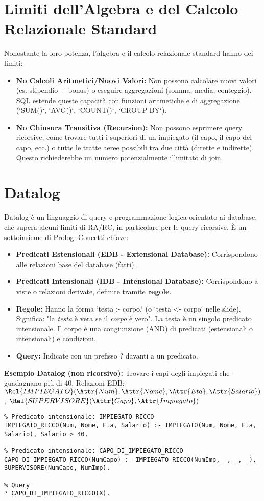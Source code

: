 \section{Limiti dell'Algebra e del Calcolo Relazionale Standard}
Nonostante la loro potenza, l'algebra e il calcolo relazionale standard hanno dei limiti:
\begin{itemize}
	\item \textbf{No Calcoli Aritmetici/Nuovi Valori:} Non possono calcolare nuovi valori (es. stipendio + bonus) o eseguire aggregazioni (somma, media, conteggio). SQL estende queste capacità con funzioni aritmetiche e di aggregazione (`SUM()`, `AVG()`, `COUNT()`, `GROUP BY`).
	\item \textbf{No Chiusura Transitiva (Recursion):} Non possono esprimere query ricorsive, come trovare tutti i superiori di un impiegato (il capo, il capo del capo, ecc.) o tutte le tratte aeree possibili tra due città (dirette e indirette). Questo richiederebbe un numero potenzialmente illimitato di join.
\end{itemize}

\section{Datalog}
Datalog è un linguaggio di query e programmazione logica orientato ai database, che supera alcuni limiti di RA/RC, in particolare per le query ricorsive. È un sottoinsieme di Prolog.
Concetti chiave:
\begin{itemize}
	\item \textbf{Predicati Estensionali (EDB - Extensional Database):} Corrispondono alle relazioni base del database (fatti).
	\item \textbf{Predicati Intensionali (IDB - Intensional Database):} Corrispondono a viste o relazioni derivate, definite tramite \textbf{regole}.
	\item \textbf{Regole:} Hanno la forma `testa :- corpo.` (o `testa <- corpo` nelle slide).
	Significa: "la \textit{testa} è vera se il \textit{corpo} è vero".
	La testa è un singolo predicato intensionale. Il corpo è una congiunzione (AND) di predicati (estensionali o intensionali) e condizioni.
	\item \textbf{Query:} Indicate con un prefisso ? davanti a un predicato.
\end{itemize}

\textbf{Esempio Datalog (non ricorsivo):} Trovare i capi degli impiegati che guadagnano più di 40.
Relazioni EDB: $\Rel{IMPIEGATO}(\Attr{Num}, \Attr{Nome}, \Attr{Eta}, \Attr{Salario})$, $\Rel{SUPERVISORE}(\Attr{Capo}, \Attr{Impiegato})$
\begin{verbatim}
% Predicato intensionale: IMPIEGATO_RICCO
IMPIEGATO_RICCO(Num, Nome, Eta, Salario) :- IMPIEGATO(Num, Nome, Eta, Salario), Salario > 40.

% Predicato intensionale: CAPO_DI_IMPIEGATO_RICCO
CAPO_DI_IMPIEGATO_RICCO(NumCapo) :- IMPIEGATO_RICCO(NumImp, _, _, _),
SUPERVISORE(NumCapo, NumImp).

% Query
? CAPO_DI_IMPIEGATO_RICCO(X).
\end{verbatim}

